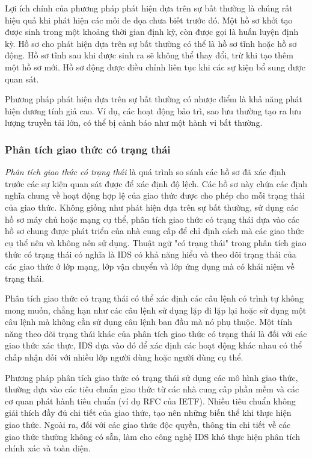 Lợi ích chính của phương pháp phát hiện dựa trên sự bất thường là chúng rất hiệu quả khi phát hiện các mối đe dọa chưa biết trước đó. Một hồ sơ khởi tạo được sinh trong một khoảng thời gian định kỳ, còn được gọi là huấn luyện định kỳ. Hồ sơ cho phát hiện dựa trên sự bất thường có thể là hồ sơ tĩnh hoặc hồ sơ động. Hồ sơ tĩnh sau khi được sinh ra sẽ không thể thay đổi, trừ khi tạo thêm một hồ sơ mới. Hồ sơ động được điều chỉnh liên tục khi các sự kiện bổ sung được quan sát.

Phương pháp phát hiện dựa trên sự bất thường có nhược điểm là khả năng phát hiện dương tính giả cao. Ví dụ, các hoạt động bảo trì, sao lưu thường tạo ra lưu lượng truyền tải lớn, có thể bị cảnh báo như một hành vi bất thường.

\subsubsection{Phân tích giao thức có trạng thái}
\emph{Phân tích giao thức có trạng thái} là quá trình so sánh các hồ sơ đã xác định trước các sự kiện quan sát được để xác định độ lệch. Các hồ sơ này chứa các định nghĩa chung về hoạt động hợp lệ của giao thức được cho phép cho mỗi trạng thái của giao thức. Không giống như phát hiện dựa trên sự bất thường, sử dụng các hồ sơ máy chủ hoặc mạng cụ thể, phân tích giao thức có trạng thái dựa vào các hồ sơ chung được phát triển của nhà cung cấp để chỉ định cách mà các giao thức cụ thể nên và không nên sử dụng. Thuật ngữ "có trạng thái" trong phân tích giao thức có trạng thái có nghĩa là IDS có khả năng hiểu và theo dõi trạng thái của các giao thức ở lớp mạng, lớp vận chuyển và lớp ứng dụng mà có khái niệm về trạng thái.

Phân tích giao thức có trạng thái có thể xác định các câu lệnh có trình tự không mong muốn, chẳng hạn như các câu lệnh sử dụng lặp đi lặp lại hoặc sử dụng một câu lệnh mà không cần sử dụng câu lệnh ban đầu mà nó phụ thuộc. Một tính năng theo dõi trạng thái khác của phân tích giao thức có trạng thái là đối với các giao thức xác thực, IDS dựa vào đó để xác định các hoạt động khác nhau có thể chấp nhận đối với nhiều lớp người dùng hoặc người dùng cụ thể.

Phương pháp phân tích giao thức có trạng thái sử dụng các mô hình giao thức, thường dựa vào các tiêu chuẩn giao thức từ các nhà cung cấp phần mềm và các cơ quan phát hành tiêu chuẩn (ví dụ RFC của IETF). Nhiều tiêu chuẩn không giải thích đầy đủ chi tiết của giao thức, tạo nên những biến thể khi thực hiện giao thức. Ngoài ra, đối với các giao thức độc quyền, thông tin chi tiết về các giao thức thường không có sẵn, làm cho công nghệ IDS khó thực hiện phân tích chính xác và toàn diện.


